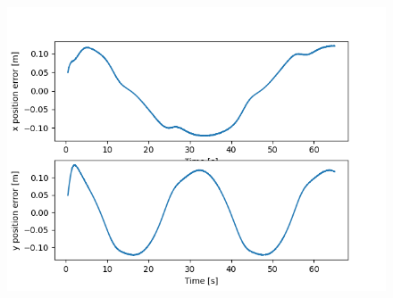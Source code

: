 \documentclass{beamer}
\begin{document}
\begin{frame}[allowframebreaks]
\begin{columns}
\begin{figure}[H]
    \centering
    \includegraphics[scale=0.3]{img/kin_screenshots/Position_Error.png}
\end{figure}

\end{columns}

\end{frame}

\end{document}
